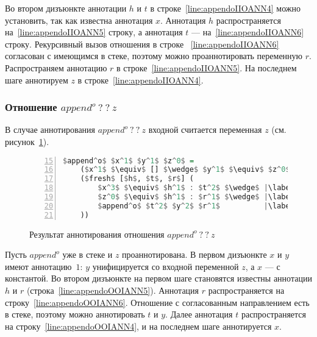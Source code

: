 Во втором дизъюнкте аннотации $h$ и $t$ в строке~\ref{line:appendoIIOANN4} можно установить, так как известна аннотация $x$.
Аннотация $h$ распространяется на~\ref{line:appendoIIOANN5} строку, а аннотация $t$ --- на~\ref{line:appendoIIOANN6} строку.
Рекурсивный вызов отношения в строке ~\ref{line:appendoIIOANN6} согласован с имеющимся в стеке, поэтому можно проаннотировать переменную $r$.
Распространяем аннотацию $r$ в строке~\ref{line:appendoIIOANN5}.
На последнем шаге аннотируем $z$ в строке~\ref{line:appendoIIOANN4}.


\subsubsection{Отношение $append^o \ ? \ ? \ z$}

В случае аннотирования $append^o \ ? \ ? \ z$ входной считается переменная $z$ (см. рисунок~\ref{lst:appendoOOIANN}).

\begin{figure}[h!]
  \begin{center}
  \begin{minipage}{0.35\textwidth}
  \begin{lstlisting}[language=Haskell, frame=single, numbers=left,numberstyle=\small, firstnumber=15, escapechar=|]
  $append^o$ $x^1$ $y^1$ $z^0$ =
    ($x^1$ $\equiv$ [] $\wedge$ $y^1$ $\equiv$ $z^0$) $\vee$ |\label{line:appendoOOIANN2}|
    ($fresh$ [$h$, $t$, $r$] (
        $x^3$ $\equiv$ $h^1$ : $t^2$ $\wedge$ |\label{line:appendoOOIANN4}|
        $z^0$ $\equiv$ $h^1$ : $r^1$ $\wedge$ |\label{line:appendoOOIANN5}|
        $append^o$ $t^2$ $y^2$ $r^1$          |\label{line:appendoOOIANN6}|
    ))
    \end{lstlisting}
  \end{minipage}
  \end{center}
  \caption{Результат аннотирования отношения $append^o \ ? \ ? \ z$}
  \label{lst:appendoOOIANN}
\end{figure}

Пусть $append^o$ уже в стеке и $z$ проаннотирована.
В первом дизъюнкте $x$ и $y$ имеют аннотацию~$1$: $y$ унифицируется со входной переменной $z$, а $x$ --- с константой.
Во втором дизъюнкте на первом шаге становятся известны аннотации $h$ и $r$ (строка~\ref{line:appendoOOIANN5}).
Аннотация $r$ распространяется на строку~\ref{line:appendoOOIANN6}. 
Отношение с согласованным направлением есть в стеке, поэтому можно аннотировать $t$ и $y$.
Далее аннотация $t$ распространяется на строку~\ref{line:appendoOOIANN4}, и на последнем шаге аннотируется $x$. 


